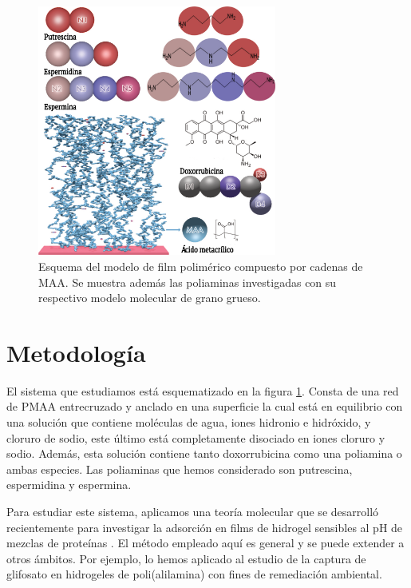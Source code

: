 \begin{figure}[!htb]
	\centering
	\includegraphics[width=0.7\textwidth]{Figures/graph-film/poliamines_model.pdf}
	\caption{Esquema del modelo  de  film polim\'erico compuesto por cadenas de MAA. Se muestra adem\'as las poliaminas investigadas  con su respectivo modelo molecular de grano grueso.}
	\label{fig:film:model_poliamines}
\end{figure}





\section{Metodolog\'ia}


El sistema que estudiamos est\'a esquematizado en la figura \ref{fig:film:model_poliamines}.
Consta de una  red de PMAA entrecruzado y anclado en una superficie  la cual est\'a en equilibrio con una soluci\'on que contiene mol\'eculas de agua, iones hidronio e hidr\'oxido, y cloruro de sodio, este \'ultimo est\'a completamente disociado en iones cloruro y sodio.
Adem\'as, esta soluci\'on contiene tanto doxorrubicina como una poliamina o ambas especies.
Las poliaminas que hemos considerado son putrescina, espermidina y espermina.

Para estudiar este sistema, aplicamos una teor\'ia molecular que se desarroll\'o recientemente para investigar la adsorci\'on en films de hidrogel sensibles al pH de mezclas de prote\'inas \cite{hagemann2018use, longo2019protonation}.
El m\'etodo empleado aqu\'i es general y se puede extender a otros \'ambitos. Por ejemplo, lo hemos aplicado al estudio de la captura de glifosato en hidrogeles de poli(alilamina) \cite{perez2018using} con fines de remediaci\'on ambiental.

